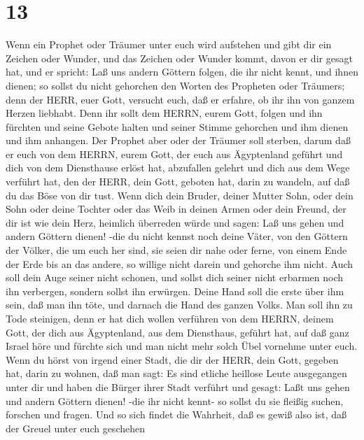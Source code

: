 \hypertarget{section-12}{%
\section{13}\label{section-12}}

 Wenn ein Prophet oder Träumer unter euch wird aufstehen und
gibt dir ein Zeichen oder Wunder,  und das Zeichen oder
Wunder kommt, davon er dir gesagt hat, und er spricht: Laß uns andern
Göttern folgen, die ihr nicht kennt, und ihnen dienen;  so
sollst du nicht gehorchen den Worten des Propheten oder Träumers; denn
der HERR, euer Gott, versucht euch, daß er erfahre, ob ihr ihn von
ganzem Herzen liebhabt.  Denn ihr sollt dem HERRN, eurem
Gott, folgen und ihn fürchten und seine Gebote halten und seiner Stimme
gehorchen und ihm dienen und ihm anhangen.  Der Prophet aber
oder der Träumer soll sterben, darum daß er euch von dem HERRN, eurem
Gott, der euch aus Ägyptenland geführt und dich von dem Diensthause
erlöst hat, abzufallen gelehrt und dich aus dem Wege verführt hat, den
der HERR, dein Gott, geboten hat, darin zu wandeln, auf daß du das Böse
von dir tust.  Wenn dich dein Bruder, deiner Mutter Sohn,
oder dein Sohn oder deine Tochter oder das Weib in deinen Armen oder
dein Freund, der dir ist wie dein Herz, heimlich überreden würde und
sagen: Laß uns gehen und andern Göttern dienen! -die du nicht kennst
noch deine Väter,  von den Göttern der Völker, die um euch
her sind, sie seien dir nahe oder ferne, von einem Ende der Erde bis an
das andere,  so willige nicht darein und gehorche ihm nicht.
Auch soll dein Auge seiner nicht schonen, und sollst dich seiner nicht
erbarmen noch ihn verbergen,  sondern sollst ihn erwürgen.
Deine Hand soll die erste über ihm sein, daß man ihn töte, und darnach
die Hand des ganzen Volks.  Man soll ihn zu Tode steinigen,
denn er hat dich wollen verführen von dem HERRN, deinem Gott, der dich
aus Ägyptenland, aus dem Diensthaus, geführt hat,  auf daß
ganz Israel höre und fürchte sich und man nicht mehr solch Übel vornehme
unter euch.  Wenn du hörst von irgend einer Stadt, die dir
der HERR, dein Gott, gegeben hat, darin zu wohnen, daß man sagt:
 Es sind etliche heillose Leute ausgegangen unter dir und
haben die Bürger ihrer Stadt verführt und gesagt: Laßt uns gehen und
andern Göttern dienen! -die ihr nicht kennt-  so sollst du
sie fleißig suchen, forschen und fragen. Und so sich findet die
Wahrheit, daß es gewiß also ist, daß der Greuel unter euch geschehen
